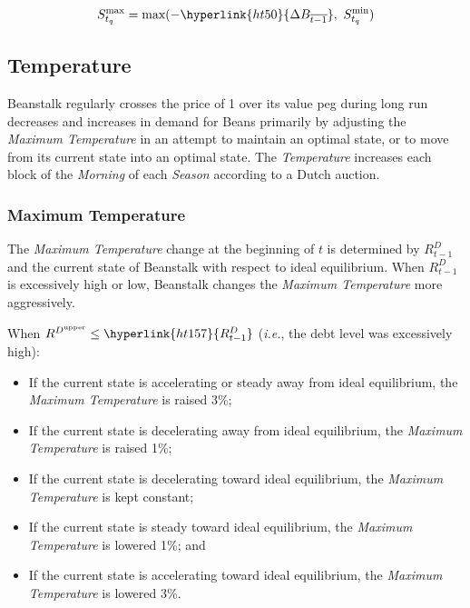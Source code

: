 \documentclass[tikz]{article}
\newcommand{\term}[1]{\textsl{#1}}
\newcommand{\Bean}{} %
\begin{document}

$$S_{t_q}^{\text{max}} = \text{max}(-\hyperlink{ht50}{\Delta B_{\overline{t-1}}},\ S_{t_q}^{\text{min}})$$

\vspace*{0mm}
\subsection{Temperature}
Beanstalk regularly crosses the price of \Bean1 over its value peg during long run decreases and increases in demand for Beans primarily by adjusting the \term{Maximum Temperature} in an attempt to maintain an optimal state, or to move from its current state into an optimal state. The \term{Temperature} increases each block of the \term{Morning} of each \term{Season} according to a Dutch auction. 

\subsubsection{Maximum Temperature}
The \term{Maximum Temperature} change at the beginning of $t$ is determined by $R^D_{t-1}$ and the current state of Beanstalk with respect to ideal equilibrium. When $R^D_{t-1}$ is excessively high or low, Beanstalk changes the \term{Maximum Temperature} more aggressively.

\newpage
When $R^{D^{\text{upper}}} \leq \hyperlink{ht157}{R^D_{t-1}}$ (\term{i.e.}, the debt level was excessively high):
\begin{itemize}[midsep]
    \item If the current state is accelerating or steady away from ideal equilibrium, the \term{Maximum Temperature} is raised 3\%;
    \item If the current state is decelerating away from ideal equilibrium, the \term{Maximum Temperature} is raised 1\%;
    \item If the current state is decelerating toward ideal equilibrium, the \term{Maximum Temperature} is kept constant;
    \item If the current state is steady toward ideal equilibrium, the \term{Maximum Temperature} is lowered 1\%; and
    \item If the current state is accelerating toward ideal equilibrium, the \term{Maximum Temperature} is lowered 3\%.
\end{itemize}
\end{document}

